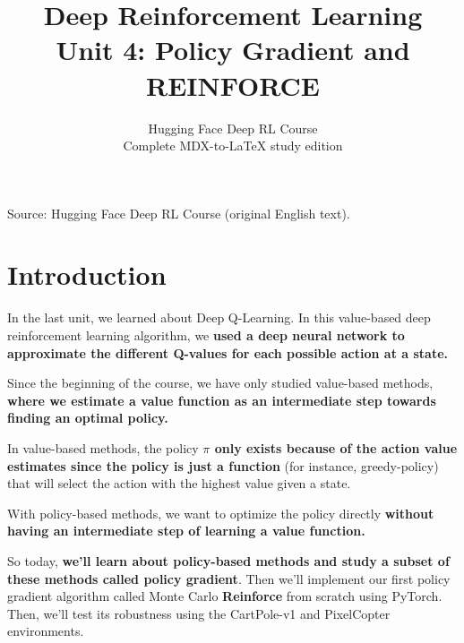 \documentclass[11pt,a4paper]{article}
\title{\textbf{Deep Reinforcement Learning}\\[0.35em]\large Unit 4: Policy Gradient and REINFORCE}
\author{Hugging Face Deep RL Course\\\small Complete MDX-to-\LaTeX{} study edition}
\date{}
\begin{document}
\maketitle
\vspace{-0.8em}
\begin{center}\small\color{secondary}Source: Hugging Face Deep RL Course (original English text).\end{center}
\begingroup\small\setlength{\parskip}{0pt}\tableofcontents\endgroup
\vspace{0.5em}
\clearpage

\section{Introduction}\label{introduction}


In the last unit, we learned about Deep Q-Learning. In this value-based deep reinforcement learning algorithm, we \textbf{used a deep neural network to approximate the different Q-values for each possible action at a state.}

Since the beginning of the course, we have only studied value-based methods, \textbf{where we estimate a value function as an intermediate step towards finding an optimal policy.}


In value-based methods, the policy \textbf{\(\pi\) only exists because of the action value estimates since the policy is just a function} (for instance, greedy-policy) that will select the action with the highest value given a state.

With policy-based methods, we want to optimize the policy directly \textbf{without having an intermediate step of learning a value function.}

So today, \textbf{we'll learn about policy-based methods and study a subset of these methods called policy gradient}. Then we'll implement our first policy gradient algorithm called Monte Carlo \textbf{Reinforce} from scratch using PyTorch. Then, we'll test its robustness using the CartPole-v1 and PixelCopter environments.
\end{document}
